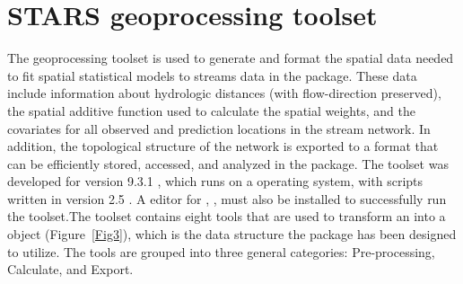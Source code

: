 \documentclass[article]{jss}
\begin{document}
%
%

\section{STARS geoprocessing toolset}

The  geoprocessing toolset is used to generate and format
the spatial data needed to fit spatial statistical models to streams
data in the  package. These data include information about
hydrologic distances (with flow-direction preserved), the spatial
additive function used to calculate the spatial weights, and the
covariates for all observed and prediction locations in the stream
network. In addition, the topological structure of the network is
exported to a format that can be efficiently stored, accessed, and
analyzed in the  package. The  toolset was
developed for  version 9.3.1
\citep{ESRI:ArcG:2009}, which runs on a  operating system,
with scripts written in  version 2.5
\citep{Hamm:Robi:pyth:2000}.  A  editor for
,  \citep{Hamm:Robi:pyth:2000},
must also be installed to successfully run the toolset.The 
toolset contains eight tools that are used to transform an 
into a  object (Figure~\ref{Fig3}), which is the data
structure the  package has been designed to utilize. The
tools are grouped into three general categories: Pre-processing,
Calculate, and Export.
\end{document}
